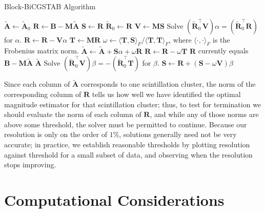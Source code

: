 \begin{algorithm}
\caption{Block-BiCGSTAB Algorithm}
\label{alg:BlBiCGSTAB}
\begin{algorithmic}[1]
\STATE $\mathbf{\widetilde{A}} \gets \mathbf{\widetilde{A}}_0$
\STATE $\mathbf{R} \gets \mathbf{B}-\mathbf{M\widetilde{A}}$ \label{algline:MatrixMul1}
\STATE $\mathbf{S} \gets \mathbf{R}$
\STATE $\mathbf{\widetilde{R}}_0 \gets \mathbf{R}$
\LOOP
  \STATE $\mathbf{V} \gets \mathbf{M}\mathbf{S}$ \label{algline:MatrixMul2}
  \STATE Solve $(\mathbf{\widetilde{R}}_0^\top \mathbf{V})\alpha = (\mathbf{\widetilde{R}}_0^\top \mathbf{R})$ for $\alpha$. \label{algline:BlBiCGSTAB_alpha}
  \STATE $\mathbf{R} \gets \mathbf{R} - \mathbf{V}\alpha$
  \STATE $\mathbf{T} \gets \mathbf{M}\mathbf{R}$ \label{algline:MatrixMul3}
  \STATE $\omega \gets {\langle \mathbf{T},\mathbf{S}\rangle_F} / {\langle \mathbf{T},\mathbf{T}\rangle_F} $, where $\langle\cdot,\cdot\rangle_F$ is the Frobenius matrix norm.
  \STATE $\mathbf{\widetilde{A}} \gets \mathbf{\widetilde{A}} + \mathbf{S}\alpha + \omega \mathbf{R}$
  \STATE $\mathbf{R} \gets \mathbf{R} - \omega \mathbf{T}$
  \STATE $\mathbf{R}$ currently equals $\mathbf{B}-\mathbf{M\widetilde{A}}$
    \RETURN $\mathbf{\widetilde{A}}$
  \ENDIF
  \STATE Solve $(\mathbf{\widetilde{R}}_0^\top \mathbf{V})\beta = -(\mathbf{\widetilde{R}}_0^\top \mathbf{T})$ for $\beta$. \label{algline:BlBiCGSTAB_beta}
  \STATE $\mathbf{S} \gets \mathbf{R} + (\mathbf{S} - \omega \mathbf{V}) \beta$
\ENDLOOP
\end{algorithmic}
\end{algorithm}

Since each column of $\mathbf{\widetilde{A}}$ corresponds to one scintillation cluster, the norm of the corresponding column of $\mathbf{R}$ tells us how well we have identified the optimal magnitude estimator for that scintillation cluster; thus, to test for termination we should evaluate the norm of each column of $\mathbf{R}$, and while any of those norms are above some threshold, the solver must be permitted to continue.  Because our resolution is only on the order of $1\%$, solutions generally need not be very accurate; in practice, we establish reasonable thresholds by plotting resolution against threshold for a small subset of data, and observing when the resolution stops improving.

\section{Computational Considerations}\label{sec:DenoisingComputationalConsiderations}

